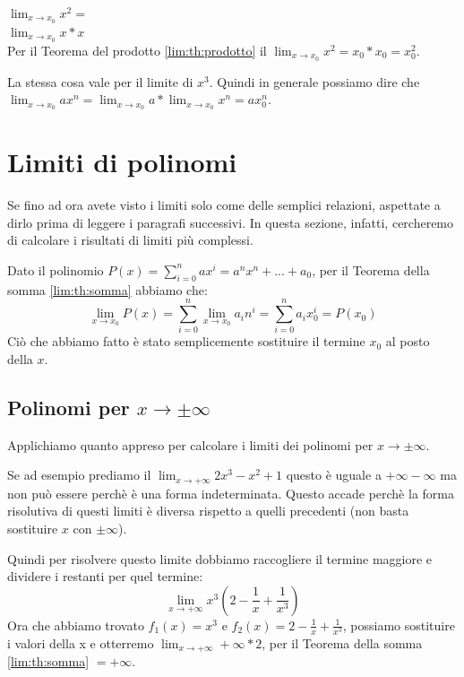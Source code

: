 \begin{example}
    $\lim_{x\to x_0}x^2=$\\$\lim_{x\to x_0}x*x$\\Per il Teorema del prodotto \ref{lim:th:prodotto} il $\lim_{x\to x_0}x^2=x_0*x_0=x_0^2$.
    
    La stessa cosa vale per il limite di $x^3$.
    Quindi in generale possiamo dire che $\lim_{x\to x_0}ax^n=\lim_{x\to x_0}a*\lim_{x\to x_0}x^n=ax_0^n$.
\end{example}


\section{Limiti di polinomi}
Se fino ad ora avete visto i limiti solo come delle semplici relazioni, aspettate a dirlo prima di leggere i paragrafi successivi. In questa sezione, infatti, cercheremo di calcolare i risultati di limiti più complessi.

Dato il polinomio $P(x)=\sum_{i=0}^{n}ax^i=a^nx^n+...+a_0$, per il Teorema della somma \ref{lim:th:somma} abbiamo che:
\begin{equation}
    \lim_{x\to x_0}P(x)=\sum_{i=0}^{n}\lim_{x\to x_0}a_in^i=\sum_{i=0}^{n}a_ix_0^i=P(x_0)
\end{equation}
Ciò che abbiamo fatto è stato semplicemente sostituire il termine $x_0$ al posto della $x$.

\subsection*{Polinomi per $x\to\pm\infty$}\label{subsec:polinf}
Applichiamo quanto appreso per calcolare i limiti dei polinomi per $x\to\pm\infty$.

Se ad esempio prediamo il $\lim_{x\to+\infty}2x^3-x^2+1$ questo è uguale a $+\infty -\infty$ ma non può essere perchè è una forma indeterminata.
Questo accade perchè la forma risolutiva di questi limiti è diversa rispetto a quelli precedenti (non basta sostituire $x$ con $\pm\infty$).

Quindi per risolvere questo limite dobbiamo raccogliere il termine maggiore e dividere i restanti per quel termine:
\begin{equation*}
    \lim_{x\to+\infty}x^3(2-\frac{1}{x}+\frac{1}{x^3})
\end{equation*}
Ora che abbiamo trovato $f_1(x)=x^3$ e $f_2(x)=2-\frac{1}{x}+\frac{1}{x^3}$, possiamo sostituire i valori della x e otterremo $\lim_{x\to+\infty}+\infty*2$, per il Teorema della somma \ref{lim:th:somma} $=+\infty$.
    
